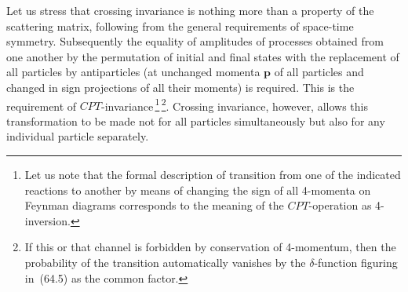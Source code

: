 Let us stress that crossing invariance is nothing more than a property of the scattering matrix, following from the general requirements of space-time symmetry. Subsequently the equality of amplitudes of processes obtained from one another by the permutation of initial and final states with the replacement of all particles by antiparticles (at unchanged momenta $\mathbf{p}$ of all particles and changed in sign projections of all their moments) is required. This is the requirement of $CPT$-invariance\,\footnote{Let us note that the formal description of transition from one of the indicated reactions to another by means of changing the sign of all 4-momenta on Feynman diagrams corresponds to the meaning of the $CPT$-operation as 4-inversion.}\,\footnote{If this or that channel is forbidden by conservation of 4-momentum, then the probability of the transition automatically vanishes by the $\delta$-function figuring in~(64.5) as the common factor.}. Crossing invariance, however, allows this transformation to be made not for all particles simultaneously but also for any individual particle separately.
